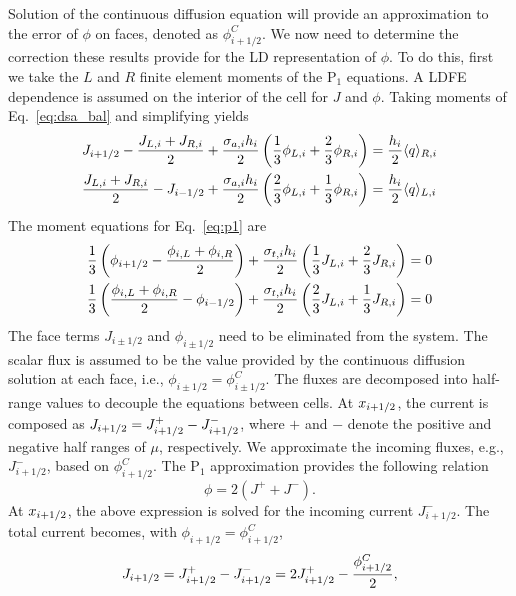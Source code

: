 Solution of the continuous diffusion equation will provide an approximation to the error
of $\phi$ on faces, denoted as $\phi_{i+1/2}^C$. We now need
to determine the correction these results provide for the LD representation of
$\phi$. To do this, first we take the $L$ and $R$ finite element moments of the P$_1$
equations.  A LDFE dependence is assumed on the interior of the cell for $J$ and
$\phi$.  Taking moments of Eq.~\eqref{eq:dsa_bal} and simplifying yields
\begin{align}
    J_{{i+1/2}} - \frac{J_{L,i} + J_{R,i}}{2} + \frac{\sigma_{a,i} h_i}{2} \left(\frac{1}{3} \phi_{L,i} +
    \frac{2}{3}\phi_{R,i}\right) &= \frac{h_i}{2} \langle q \rangle_{R,i} \\
    \frac{J_{L,i} + J_{R,i}}{2} - J_{i-1/2} + \frac{\sigma_{a,i} h_i}{2}
    \left(\frac{2}{3} \phi_{L,i} +
    \frac{1}{3}\phi_{R,i}\right) &= \frac{h_i}{2} \langle q \rangle_{L,i}
\end{align}
The moment equations for Eq.~\eqref{eq:p1} are
\begin{align}
    \frac{1}{3}\left(\phi_{{i+1/2}} - \frac{\phi_{i,L} + \phi_{i,R}}{2}\right) +
    \frac{\sigma_{t,i} h_i}{2} \left(\frac{1}{3} J_{L,i} + \frac{2}{3}J_{R,i}\right)
    &= 0 \\
    \frac{1}{3}\left(\frac{\phi_{i,L} + \phi_{i,R}}{2} - \phi_{i-1/2} \right) +
    \frac{\sigma_{t,i} h_i}{2} \left(\frac{2}{3} J_{L,i} + \frac{1}{3}J_{R,i}\right)
    &= 0 
\end{align}
The face terms $J_{i\pm 1/2}$ and $\phi_{i\pm 1/2}$ need to be eliminated from the
system. The scalar flux is assumed to be the value provided by the continuous
diffusion solution at each face, i.e., $\phi_{i\pm1/2} = \phi_{i\pm1/2}^C$.
The fluxes are decomposed into half-range values to decouple the equations
between cells.  At $x_{{i+1/2}}$, the current is composed as $J_{i+1/2} = J_{{i+1/2}}^+ - J_{{i+1/2}}^-$,
where $+$ and $-$ denote the positive and negative
half ranges of $\mu$, respectively.  We approximate the incoming fluxes, e.g.,
$J_{i+1/2}^-$, based on $\phi_{i+1/2}^C$.  
The P$_1$ approximation provides the following relation~\cite{wla_thesis}
\begin{equation}
    \phi = 2(J^+ + J^-).
\end{equation}
At ${x_{i+1/2}}$, the above expression is solved for the incoming current $J_{i+1/2}^-$.  The
total current becomes, with $\phi_{i+1/2}=\phi_{i+1/2}^C$,
\begin{equation}\label{eq:jelim}
    J_{{i+1/2}} = J_{{i+1/2}}^+ - J_{{i+1/2}}^- = 2J_{{i+1/2}}^+ - \frac{\phi_{i+1/2}^C}{2},
\end{equation}
